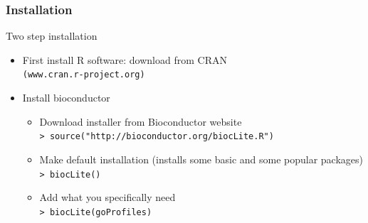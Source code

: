 \documentclass[xcolor=dvipsnames]{beamer}
\begin{document}
\begin{frame}
 \frametitle{Installation}
  Two step installation
  \begin{itemize}
  \item First install R software: download from CRAN\\
\texttt{(www.cran.r-project.org)}
\item Install bioconductor
  \begin{itemize}
  \item Download installer from Bioconductor website \\
\texttt{> source("http://bioconductor.org/biocLite.R")}\\
\item Make default installation (installs some basic and some popular packages)\\
\texttt{> biocLite()}\\
\item Add what you specifically need\\
 \texttt{> biocLite(goProfiles)}
  \end{itemize}
 \end{itemize}
\end{frame}


     
\end{document}
